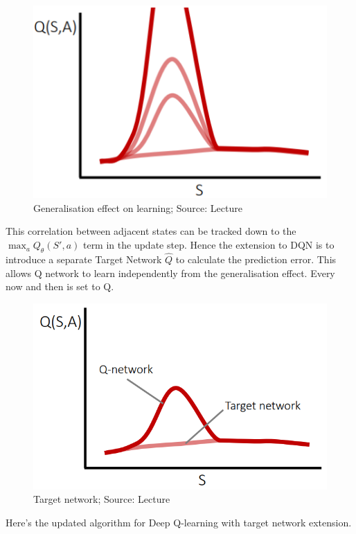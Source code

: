 \begin{figure}[h!h!h!h]
\includegraphics[scale=0.5]{figures/target 4.PNG}
  \caption{Generalisation effect on learning; Source: Lecture}
  \label{fig:generalisation_curse}
\end{figure}

This correlation between adjacent states can be tracked down to the $\max_a Q_{\theta}(S', a)$ term in the update step. Hence the 
extension to DQN is to introduce a separate Target Network $\hat{Q}$ to calculate the prediction error. This allows Q network to learn independently from the generalisation effect. Every now and then  is set to Q.

\begin{figure}[H]
\centering
\includegraphics[scale=0.4]{figures/target 0.PNG}
  \caption{Target network; Source: Lecture}
  \label{fig:target_network}
\end{figure}

Here's the updated algorithm for Deep Q-learning with target network extension.

